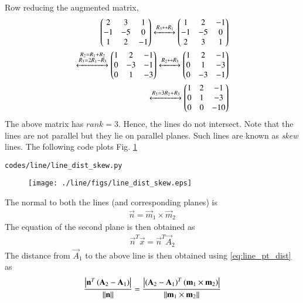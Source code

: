 \begin{enumerate}[label=\arabic*.,ref=\thesubsection.\theenumi]
\begin{align}
\end{align}
%
Row reducing the augmented matrix,
%
\begin{align}
\begin{pmatrix}
2 & 3 & 1 
\\
-1 & -5 & 0
\\
1 & 2 & -1
\end{pmatrix}
\xleftrightarrow[]{R_3\leftrightarrow R_1}
\begin{pmatrix}
1 & 2 & -1
\\
-1 & -5 & 0
\\
2 & 3 & 1 
\end{pmatrix}
\\
\xleftrightarrow[]{\substack{R_2= R_1+R_2\\R_3 = 2R_1-R_3}}
\begin{pmatrix}
1 & 2 & -1
\\
0 & -3 & -1
\\
0 & 1 & -3 
\end{pmatrix}
\xleftrightarrow[]{R_2\leftrightarrow R_3}
\begin{pmatrix}
1 & 2 & -1
\\
0 & 1 & -3 
\\
0 & -3 & -1
\end{pmatrix}
\\
\xleftrightarrow[]{R_3=3R_2+R_3}
\begin{pmatrix}
1 & 2 & -1
\\
0 & 1 & -3 
\\
0 & 0 & -10
\end{pmatrix}
\end{align}
%
The above matrix has $rank = 3$.  Hence, the lines do not intersect.  Note that the lines are not parallel but they  lie on parallel planes.  Such lines are known as {\em skew} lines.  
The following code plots 
Fig. \ref{fig:line_dist_skew} 
%
\begin{lstlisting}
codes/line/line_dist_skew.py
\end{lstlisting}
%
\begin{figure}[!ht]
\texttt{[image: ./line/figs/line\_dist\_skew.eps]}
\caption{}
\label{fig:line_dist_skew}
\end{figure}
%

The normal to both the lines (and corresponding planes) is 
%
\begin{align}
\label{eq:line_dist_skew_normal}
\vec{n} = \vec{m}_1\times\vec{m}_2
\end{align}
%
The equation of the second plane is then obtained as
%
\begin{align}
\label{eq:line_dist_skew_plane2}
\vec{n}^T \vec{x} = \vec{n}^T \vec{A}_2 
\end{align}
%
The distance from $\vec{A}_1$ to the above line is then obtained using 
\eqref{eq:line_pt_dist} as
%
\begin{align}
\label{eq:line_dist_skew}
\frac{\left\vert\mathbf{n}^T\left(\mathbf{A}_2-\mathbf{A}_1\right)\right\vert}{\left\lVert\mathbf{n}\right\rVert}
=
\frac{\left\vert\left(\mathbf{A}_2-\mathbf{A}_1\right)^T\left(\mathbf{m}_1\times\mathbf{m}_2\right)\right\vert}{\left\lVert\mathbf{m}_1\times\mathbf{m}_2\right\rVert}
\end{align}
%


\end{enumerate}
